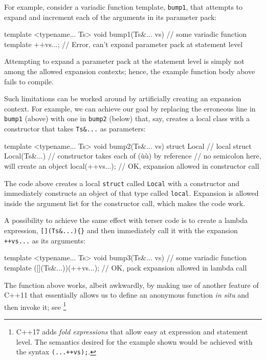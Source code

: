 For example, consider a variadic function template, \lstinline!bump1!, that
attempts to expand and increment each of the arguments in its parameter
pack:

\begin{emcppslisting}
template <typename... Ts>
void bump1(Ts&... vs)  // some variadic function template
{
    ++vs...;           // Error, can't expand parameter pack at statement level
}
\end{emcppslisting}
    

\noindent Attempting to expand a parameter pack at the statement level is simply
not among the allowed expansion contexts; hence, the example function
body above fails to compile.

Such limitations can be worked around by artificially creating an
expansion context. For example, we can achieve our goal by replacing the
erroneous line in \lstinline!bump1! (above) with one in \lstinline!bump2!
(below) that, say, creates a local class with a constructor that takes
\lstinline!Ts&...! as parameters:

\begin{emcppslisting}
template <typename... Ts>
void bump2(Ts&... vs)
{
    struct Local          // local struct
    {
        Local(Ts&...) {}  // constructor takes each of (ù{}ù) by reference
    }                     // no semicolon here, will create an object
    local(++vs...);       // OK, expansion allowed in constructor call
}
\end{emcppslisting}
    

\noindent The code above creates a local \lstinline!struct! called \lstinline!Local!
with a constructor and immediately constructs an object of that type
called \lstinline!local!. Expansion is allowed inside the argument list for
the constructor call, which makes the code work.

A possibility to achieve the same effect with terser code is to create a
lambda expression, \lstinline![](Ts&...){}! and then immediately call it
with the expansion \lstinline!++vs...! as its arguments:

\begin{emcppslisting}
template <typename... Ts>
void bump3(Ts&... vs)          // some variadic function template
{
     ([](Ts&...){})(++vs...);  // OK, pack expansion allowed in lambda call
}
\end{emcppslisting}
    

\noindent The function above works, albeit awkwardly, by making use of another
feature of C++11 that essentially allows us to define an anonymous
function \emph{in} \emph{situ} and then invoke it; see
\featureref{\locationc}{\lambda}
{\cprotect\footnote{C++17 adds \emph{fold expressions} that allow easy 
  at expression and statement level. The semantics desired for the
  example shown would be achieved with the syntax \lstinline!(...++vs);!.}}

